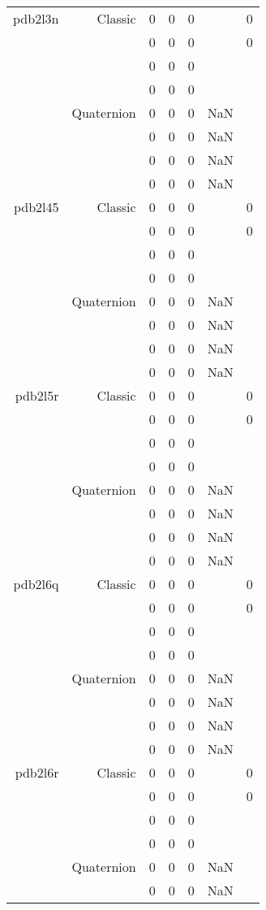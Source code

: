 \begin{xltabular}{\textwidth}{r|rcccSc}
pdb2l3n & Classic & 0 & 0 & 0 & & 0 \\
& & 0 & 0 & 0 & & 0 \\
& & 0 & 0 & 0 & & \\
& & 0 & 0 & 0 & & \\
& Quaternion & 0 & 0 & 0 & NaN & \\
& & 0 & 0 & 0 & NaN & \\
& & 0 & 0 & 0 & NaN & \\
& & 0 & 0 & 0 & NaN & \\ \addlinespace
pdb2l45 & Classic & 0 & 0 & 0 & & 0 \\
& & 0 & 0 & 0 & & 0 \\
& & 0 & 0 & 0 & & \\
& & 0 & 0 & 0 & & \\
& Quaternion & 0 & 0 & 0 & NaN & \\
& & 0 & 0 & 0 & NaN & \\
& & 0 & 0 & 0 & NaN & \\
& & 0 & 0 & 0 & NaN & \\ \addlinespace
pdb2l5r & Classic & 0 & 0 & 0 & & 0 \\
& & 0 & 0 & 0 & & 0 \\
& & 0 & 0 & 0 & & \\
& & 0 & 0 & 0 & & \\
& Quaternion & 0 & 0 & 0 & NaN & \\
& & 0 & 0 & 0 & NaN & \\
& & 0 & 0 & 0 & NaN & \\
& & 0 & 0 & 0 & NaN & \\ \addlinespace
pdb2l6q & Classic & 0 & 0 & 0 & & 0 \\
& & 0 & 0 & 0 & & 0 \\
& & 0 & 0 & 0 & & \\
& & 0 & 0 & 0 & & \\
& Quaternion & 0 & 0 & 0 & NaN & \\
& & 0 & 0 & 0 & NaN & \\
& & 0 & 0 & 0 & NaN & \\
& & 0 & 0 & 0 & NaN & \\ \addlinespace
pdb2l6r & Classic & 0 & 0 & 0 & & 0 \\
& & 0 & 0 & 0 & & 0 \\
& & 0 & 0 & 0 & & \\
& & 0 & 0 & 0 & & \\
& Quaternion & 0 & 0 & 0 & NaN & \\
& & 0 & 0 & 0 & NaN & \\

\end{xltabular}
